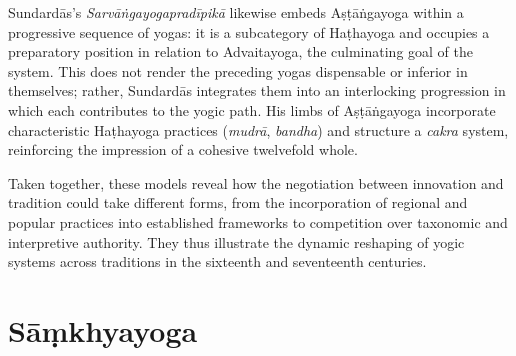 Sundardās’s \emph{Sarvāṅgayogapradīpikā} likewise embeds Aṣṭāṅgayoga within a progressive sequence of yogas: it is a subcategory of Haṭhayoga and occupies a preparatory position in relation to Advaitayoga, the culminating goal of the system. This does not render the preceding yogas dispensable or inferior in themselves; rather, Sundardās integrates them into an interlocking progression in which each contributes to the yogic path. His limbs of Aṣṭāṅgayoga incorporate characteristic Haṭhayoga practices (\textit{mudrā}, \textit{bandha}) and structure a \textit{cakra} system, reinforcing the impression of a cohesive twelvefold whole.

Taken together, these models reveal how the negotiation between innovation and tradition could take different forms, from the incorporation of regional and popular practices into established frameworks to competition over taxonomic and interpretive authority. They thus illustrate the dynamic reshaping of yogic systems across traditions in the sixteenth and seventeenth centuries.

\section{Sāṃkhyayoga}
\label{samkhyayoga}

